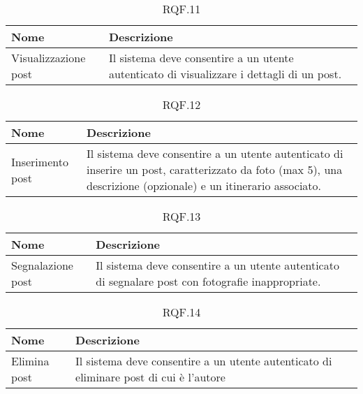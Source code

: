\documentclass{natourDoc}
\begin{document}
	\begin{table}[H]
		\centering
		\begin{tabular}{ |p{5cm}|p{10.3cm}| }
			\hline
			\rowcolor{PineGreen!70}
			\textbf{Nome} & \textbf{Descrizione} \\
			\hline
			Visualizzazione post & Il sistema deve consentire a un utente autenticato di visualizzare
			i dettagli di un post. \\
			\hline
		\end{tabular}
		\caption{RQF.11}
		\label{table:11}
	\end{table}

	\begin{table}[H]
		\centering
		\begin{tabular}{ |p{5cm}|p{10.3cm}| } 
			\hline
			\rowcolor{PineGreen!70}
			\textbf{Nome} & \textbf{Descrizione} \\
			\hline
			Inserimento post &  Il sistema deve consentire a un utente autenticato di inserire un post, 
			caratterizzato da foto (max 5), una descrizione (opzionale) e un itinerario associato. \\
			\hline
		\end{tabular}
		\caption{RQF.12}
		\label{table:12}
	\end{table}
	
	
	\begin{table}[H]
		\centering
		\begin{tabular}{ |p{5cm}|p{10.3cm}| }
			\hline
			\rowcolor{PineGreen!70}
			\textbf{Nome} & \textbf{Descrizione} \\
			\hline
			Segnalazione post & Il sistema deve consentire a un utente autenticato di segnalare post con fotografie
			inappropriate. \\
			\hline
		\end{tabular}
		\caption{RQF.13}
		\label{table:13}
	\end{table}

	\begin{table}[H]
		\centering
		\begin{tabular}{ |p{5cm}|p{10.3cm}| }
			\hline
			\rowcolor{PineGreen!70}
			\textbf{Nome} & \textbf{Descrizione} \\
			\hline
			Elimina post & Il sistema deve consentire a un utente autenticato di eliminare post di cui
			è l'autore \\
			\hline
		\end{tabular}
		\caption{RQF.14}
		\label{table:14}
	\end{table}
\end{document}
